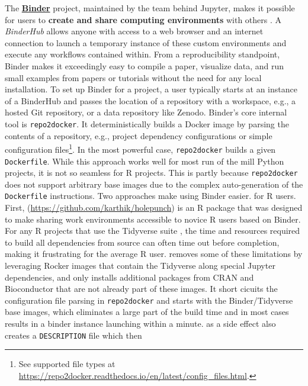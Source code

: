 The \href{https://mybinder.readthedocs.io/en/latest/}{\textbf{Binder}}
project, maintained by the team behind Jupyter, makes it possible for
users to \textbf{create and share computing environments} with others
\citep{jupyter_binder_2018}. A \emph{BinderHub} allows anyone with
access to a web browser and an internet connection to launch a temporary
instance of these custom environments and execute any workflows
contained within. From a reproducibility standpoint, Binder makes it
exceedingly easy to compile a paper, visualize data, and run small
examples from papers or tutorials without the need for any local
installation. To set up Binder for a project, a user typically starts at
an instance of a BinderHub and passes the location of a repository with
a workspace, e.g., a hosted Git repository, or a data repository like
Zenodo. Binder's core internal tool is \texttt{repo2docker}. It
deterministically builds a Docker image by parsing the contents of a
repository, e.g., project dependency configurations or simple
configuration
files\footnote{See supported file types at \href{https://repo2docker.readthedocs.io/en/latest/config\_files.html}{https://repo2docker.readthedocs.io/en/latest/config\_files.html}.}.
In the most powerful case, \texttt{repo2docker} builds a given
\texttt{Dockerfile}. While this approach works well for most run of the
mill Python projects, it is not so seamless for R projects. This is
partly because \texttt{repo2docker} does not support arbitrary base
images due to the complex auto-generation of the \texttt{Dockerfile}
instructions. Two approaches make using Binder easier. for R users.
First, \textbf{}
(\url{https://github.com/karthik/holepunch}) is an R package that was
designed to make sharing work environments accessible to novice R users
based on Binder. For any R projects that use the Tidyverse suite
\citep{wickham_welcome_2019}, the time and resources required to build
all dependencies from source can often time out before completion,
making it frustrating for the average R user.  removes
some of these limitations by leveraging Rocker images that contain the
Tidyverse along special Jupyter dependencies, and only installs
additional packages from CRAN and Bioconductor that are not already part
of these images. It short cicuits the configuration file parsing in
\texttt{repo2docker} and starts with the Binder/Tidyverse base images,
which eliminates a large part of the build time and in most cases
results in a binder instance launching within a minute. 
as a side effect also creates a \texttt{DESCRIPTION} file which then
